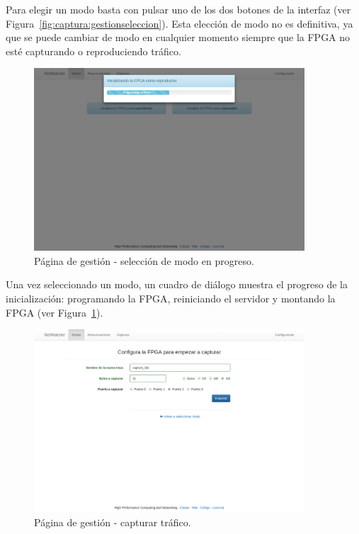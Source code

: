 Para elegir un modo basta con pulsar uno de los dos botones de la interfaz (ver Figura~\ref{fig:captura:gestionseleccion}).
Esta elección de modo no es definitiva, ya que se puede cambiar de modo en cualquier momento siempre que la \gls{FPGA} no esté capturando o reproduciendo tráfico.

\begin{figure}[!htp]
  \centering
  \includegraphics[width=0.9\textwidth,clip=true]{graphics/capturas/gestor_seleccion_progreso}
  \caption{Página de gestión - selección de modo en progreso.}
  \label{fig:captura:gestionprogreso}
\end{figure}

Una vez seleccionado un modo, un cuadro de diálogo muestra el progreso de la inicialización: programando la \gls{FPGA}, reiniciando el servidor y montando la \gls{FPGA} (ver Figura~\ref{fig:captura:gestionprogreso}).

\begin{figure}[!htp]
  \centering
  \includegraphics[width=0.9\textwidth,clip=true]{graphics/capturas/gestor_capturar}
  \caption{Página de gestión - capturar tráfico.}
  \label{fig:captura:gestioncapturar}
\end{figure}

